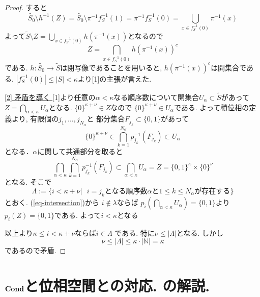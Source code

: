 \documentclass[dvipdfmx,a4paper,11pt]{report}
\newcommand{\N}{\mathbb{N}}
\newcommand{\colim}{{\rm colim}}
\theoremstyle{definition}
\begin{document}
\begin{proof}

すると
$$
\widetilde{S_0} \setminus h^{-1}(Z)
=
\widetilde{S_0} \setminus \pi^{-1}f_{S}^{-1}(1)
=
\pi^{-1} f_{S}^{-1}(0)
= \bigcup_{x \in f_{S}^{-1}(0)}  \pi^{-1}(x)
$$
よって$\widetilde{S} \setminus Z =  \bigcup_{x \in f_{S}^{-1}(0)}  h(\pi^{-1}(x))$となるので
$$
Z = \bigcap_{x \in f_{S}^{-1}(0)} h(\pi^{-1}(x))^c
$$
である. 
$h : \widetilde{S_0} \to \widetilde{S}$は閉写像であることを用いると, $h(\pi^{-1}(x))^c$は開集合である. 
$|f_{S}^{-1}(0)|\le |S| < \kappa$より[1]の主張が言えた.

\underline{[2] 矛盾を導く }
[1]より任意の$\alpha < \kappa$なる順序数について開集合$U_{\alpha} \subset \widetilde{S}$があって
$Z = \bigcap_{\alpha < \kappa} U_{\alpha}$となる. 
$\{ 0\}^{\kappa  + \nu} \in Z$なので
$ \{ 0\}^{\kappa  + \nu} \in U_{\alpha}$である.
よって積位相の定義より, 有限個の$j_1, \ldots, j_{N_{\alpha}}$と
部分集合$F_{j_k} \subset \{ 0,1\}$があって
$$
 \{ 0\}^{\kappa  + \nu}  \in 
  \bigcap_{k=1}^{N_{\alpha}} p_{j_k}^{-1}(F_{j_k})
  \subset U_{\alpha}
$$
となる．$\alpha$に関して共通部分を取ると
\begin{equation}
\label{eq-intersection}
 \bigcap_{\alpha <\kappa } \bigcap_{k=1}^{N_{\alpha}} p_{j_k}^{-1}(F_{j_k})
 \subset  \bigcap_{\alpha < \kappa}  U_{\alpha} 
 =Z=\{0,1\}^{\kappa} \times \{ 0\}^{\nu}
 \end{equation}
 となる. 
 そこで
$$
\Lambda := \{  i < \kappa + \nu  |  \text{ $i=j_{k}$となる順序数$\alpha$と$1 \le k \le N_{\alpha}$が存在する} \}
$$
とおく. 
(\ref{eq-intersection})から
$i \not \in \lambda$ならば
$p_{i}( \bigcap_{\alpha <\kappa}  U_{\alpha} ) = \{0,1\}$より
$p_{i}(Z)=\{ 0,1\}$である. 
よって$i < \kappa$となる

以上より$\kappa \le i < \kappa+\nu$ならば$i \in \Lambda$
である. 特に$\nu \le |\Lambda|$となる. 
しかし
$$
\nu \le |\Lambda| \le \kappa \cdot |\N| = \kappa
$$
であるので矛盾.
 \end{proof}






\section{${\bf Cond}$と位相空間との対応. \cite[Proposition 2.15, Theorem 2.16]{Sch19}の解説.}
\end{document}
